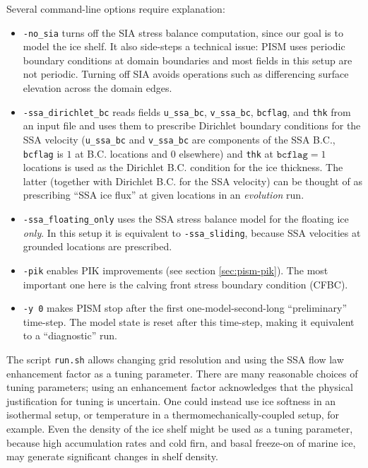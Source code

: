 \noindent Several command-line options require explanation:
\begin{itemize}
\item \texttt{-no_sia} turns off the SIA stress balance computation, since our
  goal is to model the ice shelf. It also side-steps a technical issue: PISM
  uses periodic boundary conditions at domain boundaries and most fields in
  this setup are not periodic. Turning off SIA avoids operations such as
  differencing surface elevation across the domain edges.
\item \texttt{-ssa_dirichlet_bc} reads fields \texttt{u_ssa_bc}, \texttt{v_ssa_bc}, \texttt{bcflag}, and \texttt{thk} from an input file and uses them to prescribe Dirichlet boundary conditions for the SSA velocity (\texttt{u_ssa_bc} and \texttt{v_ssa_bc} are components of the SSA B.C., \texttt{bcflag} is $1$ at B.C. locations and $0$ elsewhere) and \texttt{thk} at $\mathtt{bcflag} = 1$ locations is used as the Dirichlet B.C. condition for the ice thickness. The latter (together with Dirichlet B.C. for the SSA velocity) can be thought of as prescribing ``SSA ice flux'' at given locations in an \emph{evolution} run.
\item \texttt{-ssa_floating_only} uses the SSA stress balance model for the floating ice \emph{only}. In this setup it is equivalent to \texttt{-ssa_sliding}, because SSA velocities at grounded locations are prescribed.
\item \texttt{-pik} enables PIK improvements (see section \ref{sec:pism-pik}). The most important one here is the calving front stress boundary condition (CFBC).
\item \texttt{-y 0} makes PISM stop after the first one-model-second-long ``preliminary'' time-step.  The model state is reset after this time-step, making it equivalent to a ``diagnostic'' run.
\end{itemize}

The script \texttt{run.sh} allows changing grid resolution and using the SSA flow law enhancement factor as a tuning parameter.  There are many reasonable choices of tuning parameters; using an enhancement factor acknowledges that the physical justification for tuning is uncertain.  One could instead use ice softness in an isothermal setup, or temperature in a thermomechanically-coupled setup, for example.  Even the density of the ice shelf might be used as a tuning parameter, because high accumulation rates and cold firn, and basal freeze-on of marine ice, may generate significant changes in shelf density.

